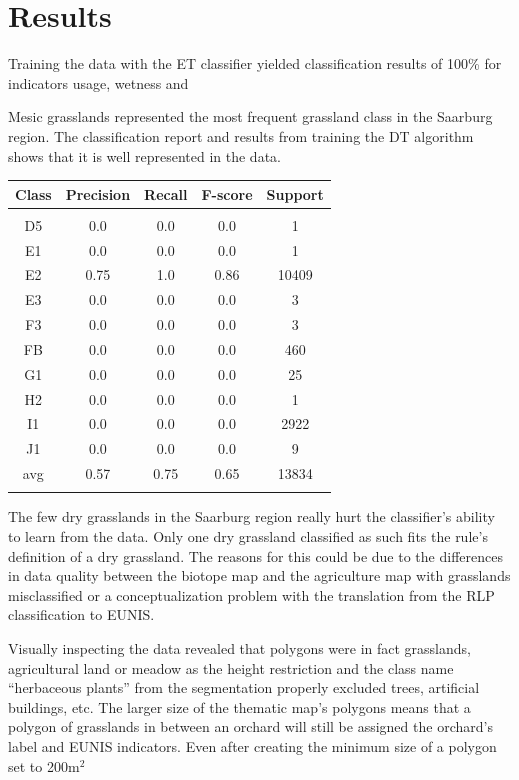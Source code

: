 \documentclass[authoryear, review,12pt,number]{elsarticle}
\begin{document}
\section{Results}
Training the data with the ET classifier yielded classification results of
100\% for indicators usage, wetness and

Mesic grasslands represented the most frequent grassland class in the Saarburg 
region. The classification report and results from training the DT algorithm  
shows that it is well represented in the data.
\begin{tabular}{c c c c c}
Class & Precision & Recall & F-score & Support\\
\hline\\
D5 & 0.0 & 0.0 & 0.0 & 1\\
E1 & 0.0 & 0.0 & 0.0 & 1\\
E2 & 0.75 & 1.0 & 0.86 & 10409\\
E3 & 0.0 & 0.0 & 0.0 & 3\\
F3 & 0.0 & 0.0 & 0.0 & 3\\
FB & 0.0 & 0.0 & 0.0 & 460\\
G1 & 0.0 & 0.0 & 0.0 & 25\\
H2 & 0.0 & 0.0 & 0.0 & 1\\
I1 & 0.0 & 0.0 & 0.0 & 2922\\
J1 & 0.0 & 0.0 & 0.0 & 9\\
avg & 0.57 & 0.75 & 0.65 & 13834\\
\label{fig_mesic_classification}
\end{tabular}

The few dry grasslands in the Saarburg region really hurt the classifier's 
ability to learn from the data. Only one dry grassland classified as such fits 
the rule's definition of a dry grassland. The reasons for this could be due to 
the differences in data quality between the biotope map and the agriculture map 
with grasslands misclassified or a conceptualization problem with the 
translation from the RLP classification to EUNIS. 

Visually inspecting the data revealed that polygons were in fact grasslands, 
agricultural land or meadow as the height restriction and the class name 
``herbaceous plants'' from the segmentation properly excluded trees, artificial 
buildings, etc. The larger size of the thematic map's 
polygons means that a polygon of grasslands in between an orchard will still be 
assigned the orchard's label and EUNIS indicators. Even after creating the 
minimum size of a polygon set to 200m$^{2}$
\end{document}
